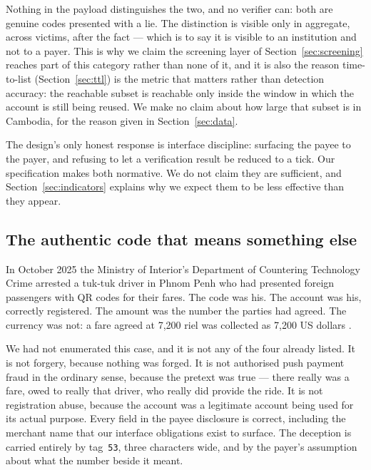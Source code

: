 \documentclass[10pt,a4paper,twocolumn]{article}
\begin{document}
Nothing in the payload distinguishes the two, and no verifier can: both are
genuine codes presented with a lie. The distinction is visible only in
aggregate, across victims, after the fact --- which is to say it is visible to an
institution and not to a payer. This is why we claim the screening layer of
Section~\ref{sec:screening} reaches part of this category rather than none of
it, and it is also the reason time-to-list (Section~\ref{sec:ttl}) is the metric
that matters rather than detection accuracy: the reachable subset is reachable
only inside the window in which the account is still being reused. We make no
claim about how large that subset is in Cambodia, for the reason given in
Section~\ref{sec:data}.

The design's only honest response is interface discipline: surfacing the payee
to the payer, and refusing to let a verification result be reduced to a tick.
Our specification makes both normative. We do not claim they are sufficient, and
Section~\ref{sec:indicators} explains why we expect them to be less effective
than they appear.

\subsection{The authentic code that means something else}
\label{sec:currency}

In October 2025 the Ministry of Interior's Department of Countering Technology
Crime arrested a tuk-tuk driver in Phnom Penh who had presented foreign
passengers with QR codes for their fares. The code was his. The account was his,
correctly registered. The amount was the number the parties had agreed. The
currency was not: a fare agreed at 7,200 riel was collected as 7,200 US dollars
\citep{khmertimes2025qrcurrency}.

We had not enumerated this case, and it is not any of the four already listed.
It is not forgery, because nothing was forged. It is not authorised push payment
fraud in the ordinary sense, because the pretext was true --- there really was a
fare, owed to really that driver, who really did provide the ride. It is not
registration abuse, because the account was a legitimate account being used for
its actual purpose. Every field in the payee disclosure is correct, including
the merchant name that our interface obligations exist to surface. The deception
is carried entirely by tag~\texttt{53}, three characters wide, and by the payer's
assumption about what the number beside it meant.
\end{document}
